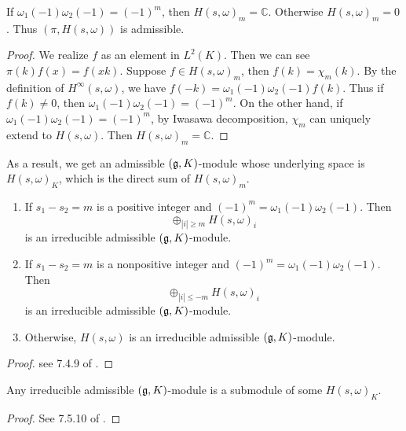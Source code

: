 \begin{proposition}
If $\omega_1(-1)\omega_2(-1)=(-1)^m$, then $H(s,\omega)_m=\mathbb C$. Otherwise $H(s,\omega)_m=0$.
Thus $(\pi, H(s,\omega))$ is admissible. 
\end{proposition}

\begin{proof}
We realize $f$ as an element in $L^2(K)$. Then we can see $\pi(k)f(x)=f(xk)$. Suppose $f\in H(s,\omega)_m$, then $f(k)=\chi_m(k)$. By the definition of $H^\infty(s,\omega)$, we have $f(-k)=\omega_1(-1)\omega_2(-1)f(k)$. Thus if $f(k)\ne 0$, then $\omega_1(-1)\omega_2(-1)=(-1)^m$. On the other hand, if $\omega_1(-1)\omega_2(-1)=(-1)^m$, by Iwasawa decomposition, $\chi_m$ can uniquely extend to $H(s,\omega)$. Then $H(s,\omega)_m=\mathbb C$.
\end{proof}

As a result, we get an admissible $(\mathfrak g, K)$-module whose underlying space is $H(s,\omega)_K$, which is the direct sum of $H(s,\omega)_m$.

\begin{proposition}\label{prop 1} \hfill
\begin{enumerate}
  \item If $s_1-s_2=m$ is a positive integer and $(-1)^m=\omega_1(-1)\omega_2(-1)$. Then
  \[ \oplus_{\left | i \right | \ge m} H(s,\omega)_i \]
  is an irreducible admissible $(\mathfrak g,K)$-module.
  \item If $s_1-s_2=m$ is a nonpositive integer and  $(-1)^m=\omega_1(-1)\omega_2(-1)$. Then
  \[ \oplus_{\left | i \right | \le -m} H(s,\omega)_i \]
  is an irreducible admissible $(\mathfrak g,K)$-module.
  \item Otherwise, $H(s,\omega)$ is an irreducible admissible $(\mathfrak g,K)$-module.
\end{enumerate}
\end{proposition}

\begin{proof}
see 7.4.9 of .
\end{proof}

\begin{theorem}
Any irreducible admissible $(\mathfrak g, K)$-module is a submodule of some $H(s,\omega)_K$.
\end{theorem}

\begin{proof}
See 7.5.10 of .
\end{proof}

